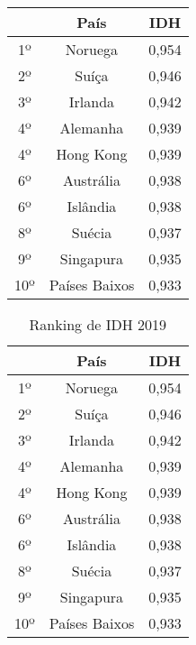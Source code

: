 \documentclass{abntex2}
\begin{document}
	\begin{table}


	\begin{tabular}{ccc}

		\toprule
	&  País  &  IDH\\
	\midrule\midrule
	1º  &  Noruega  &  0,954\\
	\hline
	2º  &  Suíça  &  0,946\\
	\hline
	3º  &  Irlanda  &  0,942\\
	\hline
	4º  &  Alemanha  &  0,939\\
	\hline
	4º  &  Hong Kong  &  0,939\\
	\hline
	6º  &  Austrália  &  0,938\\
	\hline
	6º  &  Islândia  &  0,938\\
	\hline
	8º  &  Suécia  &  0,937\\
	\hline
	9º  & Singapura  &  0,935\\
	\hline
	10º  & Países Baixos  &  0,933\\
	\bottomrule

	\end{tabular}

\end{table}


\begin{table}
	\caption{Ranking de IDH 2019}
	\label{tab:Mem}

	\begin{tabular}{ccc}

	\toprule
	   &  País  &  IDH\\
	\midrule\midrule
	 1º  &  Noruega  &  0,954\\
	 \hline
	 2º  &  Suíça  &  0,946\\
	 \hline
	 3º  &  Irlanda  &  0,942\\
	 \hline
	 4º  &  Alemanha  &  0,939\\
	 \hline
	 4º  &  Hong Kong  &  0,939\\
	 \hline
	 6º  &  Austrália  &  0,938\\
	 \hline
	 6º  &  Islândia  &  0,938\\
	 \hline
	 8º  &  Suécia  &  0,937\\
	 \hline
	 9º  & Singapura  &  0,935\\
	 \hline
	 10º  & Países Baixos  &  0,933\\
	 \bottomrule
	\end{tabular}

\end{table}
\end{document}
